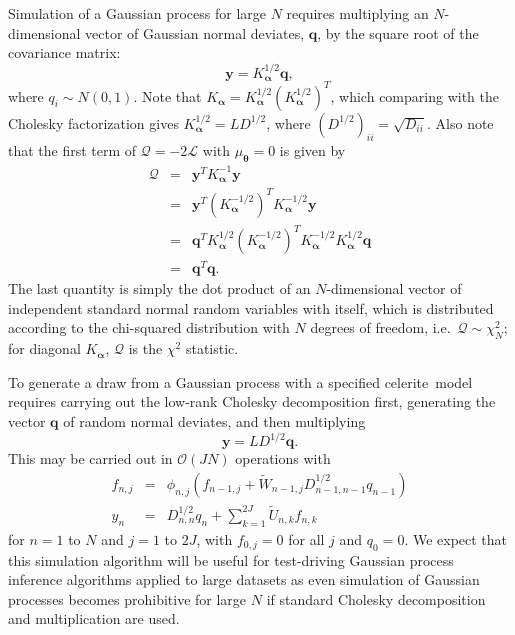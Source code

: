 \documentclass[manuscript, letterpaper]{aastex6}
\newcommand{\project}[1]{\textsf{#1}}
\newcommand{\celerite}{\project{celerite}}
\newcommand{\bvec}[1]{{\ensuremath{\boldsymbol{#1}}}}
\begin{document}
Simulation of a Gaussian process for large $N$ requires multiplying an
$N$-dimensional vector of Gaussian normal deviates, $\bvec{q}$, by the square root
of the covariance matrix:
\begin{equation}
\bvec{y} = K_\bvec{\alpha}^{1/2} \bvec{q},
\end{equation}
where $q_i \sim N(0,1)$.  Note that $K_\bvec{\alpha} = K_\bvec{\alpha}^{1/2} \left(K_\bvec{\alpha}^{1/2}\right)^T$, which
comparing with the Cholesky factorization gives $K_\bvec{\alpha}^{1/2} = L D^{1/2}$,
where $(D^{1/2})_{ii} = \sqrt{D_{ii}}$.  Also note that the first term of $\mathcal{Q} = -2 \mathcal{L}$
with $\mu_\bvec{\theta} =0$ is given by
\begin{eqnarray}
\mathcal{Q} &=&\bvec{y}^T K_\bvec{\alpha}^{-1} \bvec{y}\\
&=& \bvec{y}^T \left(K_\bvec{\alpha}^{-1/2}\right)^T K_\bvec{\alpha}^{-1/2} \bvec{y}\\
&=& \bvec{q}^T K_\bvec{\alpha}^{1/2} \left(K_\bvec{\alpha}^{-1/2}\right)^T K_\bvec{\alpha}^{-1/2} K_\bvec{\alpha}^{1/2} \bvec{q}\\
&=& \bvec{q}^T \bvec{q}.
\end{eqnarray}
The last quantity is simply the dot product of an $N$-dimensional vector of independent standard normal random variables with itself,
which is distributed according to the chi-squared distribution with $N$ degrees of freedom, i.e.\ $\mathcal{Q} \sim \chi_N^2$; for
diagonal $K_\bvec{\alpha}$, $\mathcal{Q}$ is the $\chi^2$ statistic.

To generate a draw from a Gaussian process with a specified \celerite\ model requires carrying out the
low-rank Cholesky decomposition first, generating the vector $\bvec{q}$ of random normal deviates, and then multiplying
\begin{equation}
\bvec{y} = L D^{1/2} \bvec{q}.
\end{equation}
This may be carried out in $\mathcal{O}(JN)$ operations with
\begin{eqnarray}
f_{n,j} &=& \phi_{n,j} \left(f_{n-1,j} + \tilde{W}_{n-1,j} D_{n-1,n-1}^{1/2} q_{n-1}\right)\\
y_n &=& D_{n,n}^{1/2} q_n + \sum_{k=1}^{2J} \tilde{U}_{n,k} f_{n,k}
\end{eqnarray}
for $n = 1$ to $N$ and $j=1$ to $2J$, with $f_{0,j} = 0$ for all $j$ and $q_0 = 0$.
We expect that this simulation algorithm will be useful for test-driving Gaussian
process inference algorithms applied to large datasets as even simulation of
Gaussian processes becomes prohibitive for large $N$ if standard Cholesky decomposition
and multiplication are used.
\end{document}

